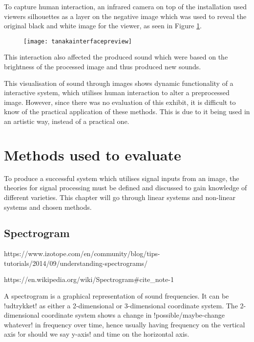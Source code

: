 To capture human interaction, an infrared camera on top of the installation used viewers silhouettes as a layer on the negative image which was used to reveal the original black and white image for the viewer, as seen in Figure \ref{fig:tanakainterfacepreview}.

\begin{figure}[!h]
\centering
\texttt{[image: tanakainterfacepreview]}
\caption{\label{fig:tanakainterfacepreview}\cite{Tanaka2012}}
\end{figure}

This interaction also affected the produced sound which were based on the brightness of the processed image and thus produced new sounds. 

This visualisation of sound through images shows dynamic functionality of a interactive system, which utilises human interaction to alter a preprocessed image. However, since there was no evaluation of this exhibit, it is difficult to know of the practical application of these methods. This is due to it being used in an artistic way, instead of a practical one.   

\section{Methods used to evaluate}\label{sub:methodsusedtoevaluate}

To produce a successful system which utilises signal inputs from an image, the theories for signal processing must be defined and discussed to gain knowledge of different varieties. This chapter will go through linear systems and non-linear systems and chosen methods. 

\subsection{Spectrogram}\label{sub:spectrogram}

https://www.izotope.com/en/community/blog/tips-tutorials/2014/09/understanding-spectrograms/

https://en.wikipedia.org/wiki/Spectrogram#cite_note-1

A spectrogram is a graphical representation of sound frequencies. It can be !udtrykket! as either a 2-dimensional or 3-dimensional coordinate system. The 2-dimensional coordinate system shows a change in !possible/maybe-change whatever! in frequency over time, hence usually having frequency on the vertical axis !or should we say y-axis! and time on the horizontal axis. 

